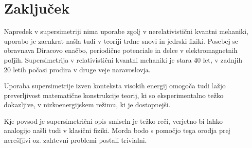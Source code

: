 \section{Zaklju\v cek}

Napredek v supersimetriji nima uporabe zgolj v nerelativisti\v cni kvantni mehaniki, uporabo je zaenkrat na\v sla tudi
v teoriji trdne snovi in jedrski fiziki. Posebej se obravnava Diracovo ena\v cbo, periodi\v cne potenciale in delce v
elektromagnetnih poljih. Supersimetrija v relativisti\v cni kvantni mehaniki je stara 40 let, v zadnjih 20 letih po\v casi
prodira v druge veje naravoslovja.

Uporaba supersimetrije izven konteksta visokih energij omogo\v ca tudi la\v zjo
preverljivost matemati\v cne konstrukcije teorij, ki so eksperimentalno te\v zko dokazljive, v nizkoenergijskem re\v zimu,
ki je dostopnej\v si.

Kje povsod je supersimetri\v cni opis smiseln je te\v zko re\v ci, verjetno bi lahko analogijo na\v sli tudi v klasi\v cni
fiziki. Morda bodo s pomo\v cjo tega orodja prej nere\v sljivi oz. zahtevni problemi postali trivialni.
